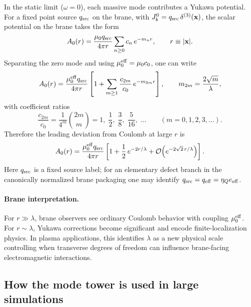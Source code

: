 \documentclass[11pt]{article}
\begin{document}
In the static limit (\(\omega=0\)), each massive mode contributes a Yukawa potential.
For a fixed point source \(q_{\rm src}\) on the brane, with
\(J_b^0=q_{\rm src}\,\delta^{(3)}(\mathbf{x})\),
the scalar potential on the brane takes the form
\begin{equation}
A_0(r)
=
\frac{\mu_0 q_{\rm src}}{4\pi r}\sum_{n\ge 0}c_n\,e^{-m_n r},
\qquad r\equiv|\mathbf{x}|.
\label{eq:A0_KK_sum_app}
\end{equation}
Separating the zero mode and using \(\mu_0^{\rm eff}=\mu_0 c_0\), one can write
\begin{equation}
A_0(r)
=
\frac{\mu_0^{\rm eff} q_{\rm src}}{4\pi r}
\left[
1+\sum_{m\ge 1}\frac{c_{2m}}{c_0}\,e^{-m_{2m}r}
\right],
\qquad
m_{2m}=\frac{2\sqrt{m}}{\lambda},
\label{eq:A0_mu_eff_form_app}
\end{equation}
with coefficient ratios
\begin{equation}
\frac{c_{2m}}{c_0}
=
\frac{1}{4^m}\binom{2m}{m}
= 1,\;\frac12,\;\frac{3}{8},\;\frac{5}{16},\;\ldots
\qquad (m=0,1,2,3,\ldots).
\label{eq:cn_ratio_app}
\end{equation}
Therefore the leading deviation from Coulomb at large \(r\) is
\begin{equation}
A_0(r)
=
\frac{\mu_0^{\rm eff} q_{\rm src}}{4\pi r}
\left[
1+\frac12\,e^{-2r/\lambda}
+\mathcal{O}\!\left(e^{-2\sqrt{2}\,r/\lambda}\right)
\right].
\label{eq:leading_yukawa_em_app}
\end{equation}
Here \(q_{\rm src}\) is a fixed source label; for an elementary defect branch in the
canonically normalized brane packaging one may identify
\(q_{\rm src}=q_{\rm eff}=\eta_Q e_{\rm eff}\).

\paragraph{Brane interpretation.}
For \(r\gg \lambda\), brane observers see ordinary Coulomb behavior with coupling
\(\mu_0^{\rm eff}\). For \(r\sim \lambda\), Yukawa corrections become significant and
encode finite-localization physics. In plasma applications, this identifies \(\lambda\)
as a new physical scale controlling when transverse degrees of freedom can influence
brane-facing electromagnetic interactions.

\subsection{How the mode tower is used in large simulations}
\label{app:mode_tower_in_computation}
\end{document}
